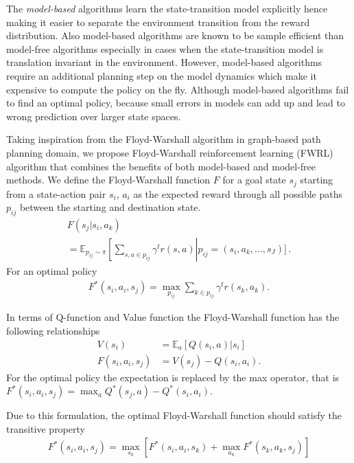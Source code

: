 \documentclass[letterpaper]{article} %
\def\state{s}
\def\act{a}
\def\E{\mathbb{E}}
\newcommand{\discount}{\gamma}
\begin{document}
The \emph{model-based} algorithms learn the state-transition model explicitly hence making it
easier to separate the environment transition from the reward distribution. Also model-based
algorithms are known to be sample efficient than model-free algorithms especially in cases when
the state-transition model is translation invariant in the environment. 
However, model-based algorithms require an additional planning step on the model dynamics
which make it expensive to compute the policy on the fly.
Although model-based algorithms fail to find an optimal policy, because small errors in models can add up and lead to wrong prediction over larger state spaces. 

Taking inspiration from the Floyd-Warshall algorithm in graph-based path planning domain,
we propose Floyd-Warshall reinforcement learning (FWRL) algorithm that combines the
benefits of both model-based and model-free methods.
We define the Floyd-Warshall function $F$ for a goal state $\state_j$ starting from a
state-action pair $\state_i$, $\act_i$
as the expected reward through all possible paths $p_{ij}$ between the starting and
destination state.
%
\begin{multline}
F(\state_j | \state_i, \act_k) \\
= \E_{p_{ij} \sim \pi}\left[
\sum_{\state, \act \in p_{ij} } \discount^{t} r(\state, \act) \right| p_{ij} = (\state_i, \act_k, \dots, \state_J) \Biggr] \, .
\end{multline}
%
For an optimal policy
\begin{align}
F^*(\state_i, \act_i, \state_j) =
\max_{p_{ij}} \sum_{k \in p_{ij} } \discount^{t} r(\state_k, \act_k) .
\end{align}

In terms of Q-function and Value function the Floyd-Warshall function has the following relationships
\begin{align}
V(\state_i) &= \E_{\act}[Q(\state_i, \act)|\state_i] \\
F(\state_i, \act_i, \state_j) &= V(\state_j) - Q(\state_i, \act_i).
\end{align}
For the optimal policy the expectation is replaced by the max operator, that is $F^*(\state_i, \act_i, \state_j) = \max_{\act} Q^*(\state_j, \act) - Q^*(\state_i, \act_i)$.

Due to this formulation, the optimal Floyd-Warshall function should satisfy the transitive property
\begin{align}
F^*(\state_i, \act_i, \state_j) = \max_{\state_k} \left[ F^*(\state_i, \act_i, \state_k)
+ \max_{\act_k}F^*(\state_k, \act_k, \state_j) \right]
\label{eq:transitive-fw}
\end{align}
\end{document}
